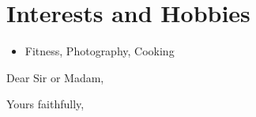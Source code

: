 \documentclass[11pt,a4paper,sans]{moderncv}        %
\begin{document}
\section{Interests and Hobbies}
\begin{itemize}%
\item{Fitness, Photography, Cooking} 
\end{itemize}  



\nocite{*}



\clearpage
\date{January 01, 1984}
\opening{Dear Sir or Madam,}
\closing{Yours faithfully,}
\makelettertitle
\end{document}
